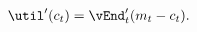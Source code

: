   \begin{equation}\begin{gathered}\begin{aligned}
    \util^{\prime}({c}_{t})   & = {\vEnd}_{t}^{\prime}({m}_{t}-{c}_{t}).
                                   \label{eq:upEqbetaOp}
  \end{aligned}\end{gathered}\end{equation}
